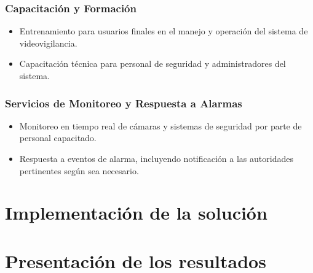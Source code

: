 \documentclass{report}
\begin{document}
          \subsection{Capacitación y Formación}
            \begin{itemize}
              \item Entrenamiento para usuarios finales en el manejo y operación del sistema de videovigilancia.
              \item Capacitación técnica para personal de seguridad y administradores del sistema.
            \end{itemize}
          \subsection{Servicios de Monitoreo y Respuesta a Alarmas}
            \begin{itemize}
              \item Monitoreo en tiempo real de cámaras y sistemas de seguridad por parte de personal capacitado.
              \item Respuesta a eventos de alarma, incluyendo notificación a las autoridades pertinentes según sea necesario.
            \end{itemize}
    \chapter{Implementación de la solución}
    \chapter{Presentación de los resultados}
    
    
\end{document}
